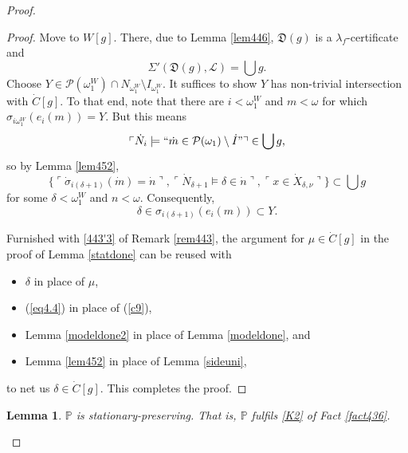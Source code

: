 \documentclass[12pt, twoside]{memoir}
\numberwithin{equation}{section}
\newtheorem{lem}[thm]{Lemma}
\theoremstyle{definition}
\theoremstyle{remark}
\theoremstyle{definition}
\theoremstyle{definition}
\theoremstyle{definition}
\theoremstyle{remark}
\begin{document}
\begin{proof}
\begin{proof}
Move to $W[g]$. There, due to Lemma \ref{lem446}, $\mathfrak{D}(g)$ is a $\lambda_f$-certificate and
\begin{equation*}
    \Sigma'(\mathfrak{D}(g), \mathcal{L}) = \bigcup g \text{.}
\end{equation*}
Choose $Y \in \mathcal{P}(\omega_1^W) \cap N_{\omega_1^W} \setminus I_{\omega_1^W}$. It suffices to show $Y$ has non-trivial intersection with $\dot{C}[g]$. To that end, note that there are $i < \omega_1^W$ and $m < \omega$ for which $\sigma_{i\omega_1^W}(e_i(m)) = Y$. But this means
\begin{equation*}
    \ulcorner \dot{N}_i \models ``\dot{m} \in \mathcal{P}(\omega_1) \setminus \dot{I}" \urcorner \in \bigcup g \text{,}
\end{equation*}
so by Lemma \ref{lem452}, 
\begin{equation*}
    \{\ulcorner \dot{\sigma}_{i(\delta + 1)}(\dot{m}) = \dot{n} \urcorner, \ulcorner \dot{N}_{\delta + 1} \models \delta \in \dot{n} \urcorner, \ulcorner x \in \dot{X}_{\delta, \nu} \urcorner\} \subset \bigcup g
\end{equation*}
for some $\delta < \omega_1^W$ and $n < \omega$. Consequently, 
\begin{equation*}
    \delta \in \sigma_{i(\delta + 1)}(e_i(m)) \subset Y \text{.}
\end{equation*}

Furnished with \ref{443'3} of Remark \ref{rem443}, the argument for $\mu \in \dot{C}[g]$ in the proof of Lemma \ref{statdone} can be reused with 
\begin{itemize}
    \item $\delta$ in place of $\mu$, 
    \item (\ref{eq4.4}) in place of (\ref{c9}),
    \item Lemma \ref{modeldone2} in place of Lemma \ref{modeldone}, and
    \item Lemma \ref{lem452} in place of Lemma \ref{sideuni},
\end{itemize}
to net us $\delta \in \dot{C}[g]$. This completes the proof.
\end{proof}

\begin{lem}\label{lem454}
$\mathbb{P}$ is stationary-preserving. That is, $\mathbb{P}$ fulfils \ref{K2} of Fact \ref{fact436}.
\end{lem}


\end{proof}
\end{document}
